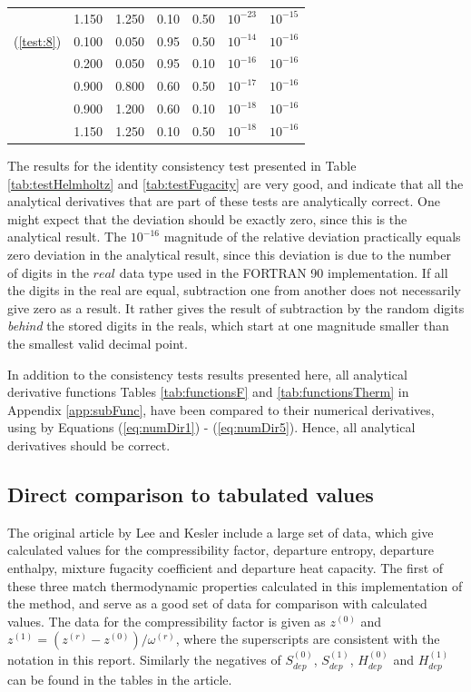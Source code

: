 \documentclass[internal,english]{sintefmemo2012}
\numberwithin{equation}{section}
\newcommand*{\reff}[1]{(\ref{#1})}
\begin{document}
\begin{table}[h!]
\begin{tabular}{c c c c c c c}
      				& 1.150	& 1.250	& 0.10		&0.50		& $10^{-23}$	&  $10^{-15}$	\\
      \reff{test:8}	& 0.100	& 0.050	& 0.95		&0.50		& $10^{-14}$	&  $10^{-16}$	\\
      				& 0.200	& 0.050	& 0.95		&0.10		& $10^{-16}$	&  $10^{-16}$	\\
      				& 0.900	& 0.800	& 0.60		&0.50		& $10^{-17}$	&  $10^{-16}$	\\
      				& 0.900	& 1.200	& 0.60		&0.10		& $10^{-18}$	&  $10^{-16}$	\\
      				& 1.150	& 1.250	& 0.10		&0.50		& $10^{-18}$	&  $10^{-16}$	\\
      \hline
    \end{tabular}
\end{table}

The results for the identity consistency test presented in Table \ref{tab:testHelmholtz} and \ref{tab:testFugacity} are very good, and indicate that all the analytical derivatives that are part of these tests are analytically correct. One might expect that the deviation should be exactly zero, since this is the analytical result. The $10^{-16}$ magnitude of the relative deviation practically equals zero deviation in the analytical result, since this deviation is due to the number of digits in the $real$ data type used in the FORTRAN 90 implementation. If all the digits in the real are equal, subtraction one from another does not necessarily give zero as a result. It rather gives the result of subtraction by the random digits \textit{behind} the stored digits in the reals, which start at one magnitude smaller than the smallest valid decimal point.

In addition to the consistency tests results presented here, all analytical derivative functions Tables \ref{tab:functionsF} and \ref{tab:functionsTherm} in Appendix \ref{app:subFunc}, have been compared to their numerical derivatives, using by Equations \reff{eq:numDir1} - \reff{eq:numDir5}. Hence, all analytical derivatives should be correct.

\subsection{Direct comparison to tabulated values}
\label{subsec:dircomp}
The original article by Lee and Kesler \cite{LK} include a large set of data, which give calculated values for the compressibility factor, departure entropy, departure enthalpy, mixture fugacity coefficient and departure heat capacity. The first of these three match thermodynamic properties calculated in this implementation of the method, and serve as a good set of data for comparison with calculated values. The data for the compressibility factor is given as $z^{(0)}$ and $z^{(1)} = (z^{(r)} - z^{(0)})/\omega^{(r)}$, where the superscripts are consistent with the notation in this report. Similarly the negatives of $S_{dep}^{(0)}$, $S_{dep}^{(1)}$, $H_{dep}^{(0)}$ and $H_{dep}^{(1)}$ can be found in the tables in the article. 
\end{document}
